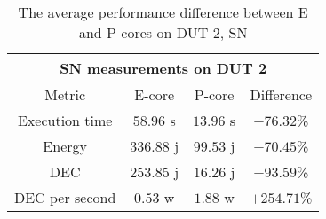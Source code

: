 \begin{table}[H]
    \centering
    \begin{tabular}{|| c | c | c | c ||}
    \hline
    \multicolumn{4}{||c||}{SN measurements on DUT 2} \\ [0.5ex] \hline\hline
    Metric & E-core & P-core & Difference \\\hline
    Execution time & $58.96$ s & $13.96$ s & $-76.32$\% \\
    Energy & $336.88$ j & $99.53$ j & $-70.45$\% \\
    DEC & $253.85$ j & $16.26$ j & $-93.59$\% \\
    DEC per second & $0.53$ w & $1.88$ w & $+254.71$\% \\\hline
    \end{tabular}
    \caption{The average performance difference between E and P cores on DUT 2, SN}
    \label{tab:dut-2-exp-3-sn}
\end{table}












